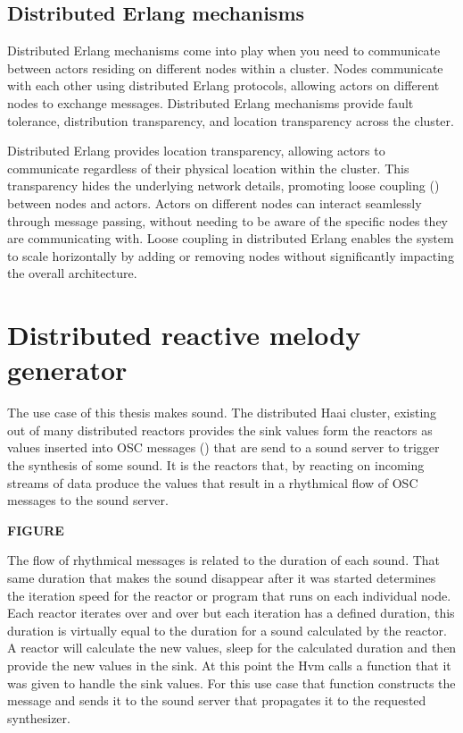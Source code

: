 \documentclass[a4paper]{book}
\begin{document}
\section{Distributed Erlang mechanisms}
Distributed Erlang mechanisms come into play when you need to communicate between actors residing on different nodes within a cluster.
Nodes communicate with each other using distributed Erlang protocols, allowing actors on different nodes to exchange messages. Distributed Erlang mechanisms provide fault tolerance, distribution transparency, and location transparency across the cluster. 

Distributed Erlang provides location transparency, allowing actors to communicate regardless of their physical location within the cluster. This transparency hides the underlying network details, promoting loose coupling (\cite{DBLP:conf/tools/CarretonMCM10}) between nodes and actors. Actors on different nodes can interact seamlessly through message passing, without needing to be aware of the specific nodes they are communicating with. Loose coupling in distributed Erlang enables the system to scale horizontally by adding or removing nodes without significantly impacting the overall architecture.

\chapter{Distributed reactive melody generator}
The use case of this thesis makes sound. The distributed Haai cluster, existing out of many distributed reactors provides the sink values form the reactors as values inserted into OSC messages (\cite{schmeder2010best}) that are send to a sound server to trigger the synthesis of some sound. It is the reactors that, by reacting on incoming streams of data produce the values that result in a rhythmical flow of OSC messages to the sound server. 

\textbf{FIGURE}
 
The flow of rhythmical messages is related to the duration of each sound. That same duration that makes the sound disappear after it was started determines the iteration speed for the reactor or program that runs on each individual node. Each reactor iterates over and over but each iteration has a defined duration, this duration is virtually equal to the duration for a sound calculated by the reactor. A reactor will calculate the new values, sleep for the calculated duration and then provide the new values in the sink. At this point the Hvm calls a function that it was given to handle the sink values. For this use case that function constructs the message and sends it to the sound server that propagates it to the requested synthesizer. 
\end{document}

